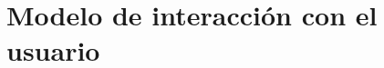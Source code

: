 \documentclass[10pt]{book}
\begin{document}
%	
%	
%	
	
	
	\chapter{Modelo de interacción con el usuario} \label{chp:modeloInteraccionUsuario}
	
\end{document}
